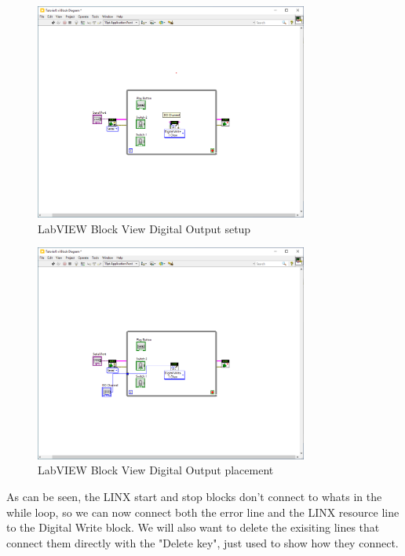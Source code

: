 \documentclass[a4paper,11pt]{report}
\begin{document}
\begin{figure}[H]
\centering
\includegraphics[width=0.8\textwidth]{screenshots/labview20}
\caption{LabVIEW Block View Digital Output setup}
\end{figure}

\begin{figure}[H]
\centering
\includegraphics[width=0.8\textwidth]{screenshots/labview21}
\caption{LabVIEW Block View Digital Output placement}
\end{figure}

As can be seen, the LINX start and stop blocks don't connect to whats in the while loop, so we can now connect both the error line and the LINX resource line to the Digital Write block. We will also want to delete the exisiting lines that connect them directly with the "Delete key", just used to show how they connect.
\end{document}
